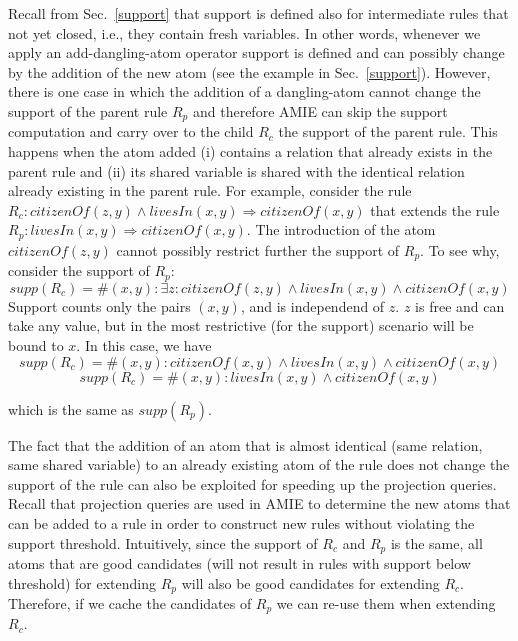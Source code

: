 Recall from Sec.~\ref{support} that support is defined also for intermediate rules that not  yet closed, i.e., they contain fresh variables. 
In other words, whenever we apply an add-dangling-atom operator support is defined and can possibly change by the addition of the new atom (see the example in Sec.~\ref{support}).
However, there is one case in which the addition of a dangling-atom cannot change the support of the parent rule $R_p$ and therefore AMIE can skip the support computation and carry over to the child $R_c$
the support of the parent rule. This happens when the atom added (i) contains a relation that already exists in the parent rule and 
(ii) its shared variable is shared with the identical relation already existing in the parent rule. For example, consider the rule $R_c:citizenOf(z,y)\wedge livesIn(x,y)\Rightarrow citizenOf(x,y)$ that
extends the rule $R_p:livesIn(x,y)\Rightarrow citizenOf(x,y)$. The introduction of the atom $citizenOf(z,y)$ cannot possibly restrict further the support of $R_p$. 
To see why, consider the support of $R_p$:
\[ supp(R_c) = \#(x,y): \exists z:  citizenOf(z,y)\wedge livesIn(x,y)\wedge citizenOf(x,y) \]
Support counts only the pairs $(x,y)$, and is independend of $z$.  
$z$ is free and can take any value, but in the most restrictive (for the support) scenario will be bound to $x$. 
In this case, we have 
\[
 supp(R_c) = \#(x,y):  citizenOf(x,y)\wedge livesIn(x,y)\wedge citizenOf(x,y)
\]
\[
 supp(R_c) = \#(x,y):   livesIn(x,y)\wedge citizenOf(x,y)
\]

which is the same as $supp(R_p)$.

The fact that the addition of an atom that is almost identical (same relation, same shared variable)  to an already existing atom of the rule does not change the support of the rule 
can also be exploited for speeding up the projection queries. 
Recall that projection queries are used in AMIE to determine the new atoms that can be added to a rule in order to construct new rules without violating the support threshold.
Intuitively, since the support of $R_c$ and $R_p$ is the same, all atoms that are good candidates (will not result in rules with support below threshold) for extending $R_p$ 
will also be good candidates for extending $R_c$.  Therefore, if we  cache the candidates of $R_p$ we can re-use them when extending $R_c$.



